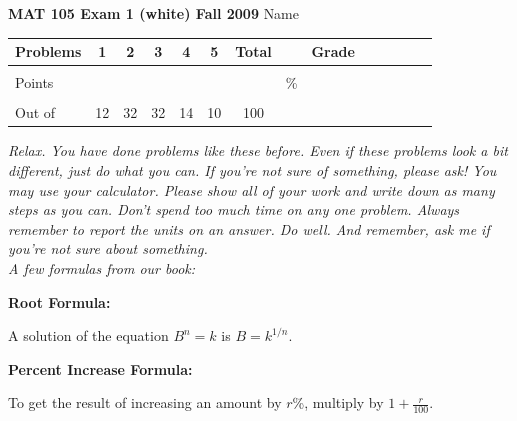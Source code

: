 \documentclass[12pt]{article}
\begin{document}
\textbf{MAT 105 Exam 1 (white) Fall 2009} \hspace{.4in} {\large Name} \hrulefill

\begin{center}

\begin{tabular}
{|l|c|c|c|c|c|c|c|c|c|c|c|c|c|} \hline

 Problems & \hspace{5 pt} 1 \hspace{5 pt}  & \hspace{5 pt} 2 \hspace{5 pt} & \hspace{5 pt} 3 \hspace{5 pt} & \hspace{5 pt} 4 \hspace{5 pt} & \hspace{5 pt} 5 \hspace{5 pt} & \hspace{5 pt} Total  \hspace{5 pt} & &  \hspace{5 pt} Grade \hspace{5 pt}  \\ \hline
&&&&&&&&\\  
Points &&&&&&&    \hspace{.8in}\% &  \\ 
&&&&&&&& \\  \hline
Out of & 12 & 32 & 32 & 14 & 10 &100 & & \\ \hline

\end {tabular}

\end{center}

\vspace{.2in}

 \emph{Relax.  You have done problems like these before.  Even if these problems look a bit different, just do what you can.  If you're not sure of something, please ask! You may use your calculator.  Please show all of your work and write down as many steps as you can.  Don't spend too much time on any one problem.  Always remember to report the units on an answer. Do well.  And remember, ask me if you're not sure about something.} \\

\vspace{.5in} 
\noindent \emph{A few formulas from our book:}
\begin{center}

\textbf{Root Formula:} 

A solution of the equation $B^n=k$ is $B=k^{1/n}$.

\vspace{.2in} 

\textbf{Percent Increase Formula:} 

To get the result of increasing an amount by $r$\%, multiply by $1 + \frac{r}{100}$.

\end{center}
\end{document}
